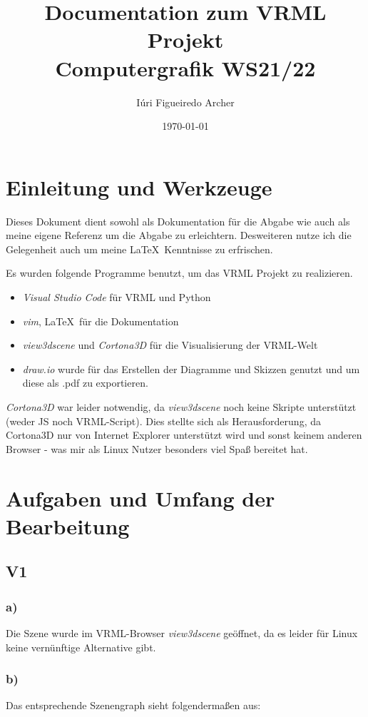 \documentclass{article}
\author{Iúri Figueiredo Archer}
\date{\today}
\title{Documentation zum VRML Projekt\\\large{Computergrafik WS21/22}}
\begin{document}
\maketitle
\section*{Einleitung und Werkzeuge}
Dieses Dokument dient sowohl als Dokumentation für die Abgabe wie auch
als meine eigene Referenz um die Abgabe zu erleichtern. Desweiteren
nutze ich die Gelegenheit auch um meine \LaTeX\ Kenntnisse zu
erfrischen.

Es wurden folgende Programme benutzt, um das VRML Projekt zu
realizieren.
\begin{itemize}
\item \textit{Visual Studio Code} für VRML und Python
\item \textit{vim}, \LaTeX\ für die Dokumentation
\item \textit{view3dscene} und \textit{Cortona3D} für die
Visualisierung der VRML-Welt
\item \textit{draw.io} wurde für das Erstellen der Diagramme und
Skizzen genutzt und um diese als .pdf zu exportieren.
\end{itemize}

\textit{Cortona3D} war leider notwendig, da \textit{view3dscene} noch
keine Skripte unterstützt (weder JS noch VRML-Script). 
Dies stellte sich als Herausforderung, da Cortona3D nur von Internet
Explorer unterstützt wird und sonst keinem anderen Browser - was mir
als Linux Nutzer besonders viel Spaß bereitet hat.





\newpage

\section{Aufgaben und Umfang der Bearbeitung}
\subsection*{V1}
\subsubsection*{a)}
Die Szene wurde im VRML-Browser \textit{view3dscene} geöffnet, da es
leider für Linux keine vernünftige Alternative gibt. 

\subsubsection*{b)}
Das entsprechende Szenengraph sieht folgendermaßen aus:
\end{document}
